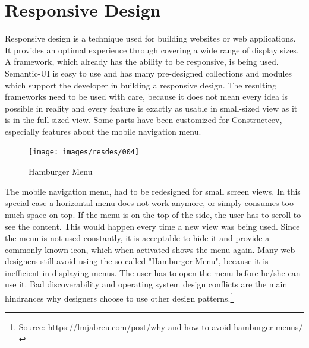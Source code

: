 \section{Responsive Design}
Responsive design is a technique used for building websites or web applications. It provides an optimal experience through covering a wide range of display sizes. A framework, which already has the ability to be responsive, is being used. 
Semantic-UI is easy to use and has many pre-designed collections and modules which support the developer in building a responsive design. The resulting frameworks need to be used with care, because it does not mean every idea is possible in reality and every feature is exactly as usable in small-sized view as it is in the full-sized view. Some parts have been customized for Constructeev, especially features about the mobile navigation menu.
\begin{figure}
  \caption{Hamburger Menu}
  \centering
    \texttt{[image: images/resdes/004]}
\end{figure}
\textcolor{newcode}{The mobile navigation menu, had to be redesigned for small screen views. In this special case a horizontal menu does not work anymore, or simply consumes too much space on top. If the menu is on the top of the side, the user has to scroll to see the content. This would happen every time a new view was being used. Since the menu is not used constantly, it is acceptable to hide it and provide a commonly known icon, which when activated shows the menu again.
Many web-designers still avoid using the so called "Hamburger Menu", because it is inefficient in displaying menus. The user has to open the menu before he/she can use it. Bad discoverability and operating system design conflicts are the main hindrances why designers choose to use other design patterns.\footnote{Source: https://lmjabreu.com/post/why-and-how-to-avoid-hamburger-menus/}}

